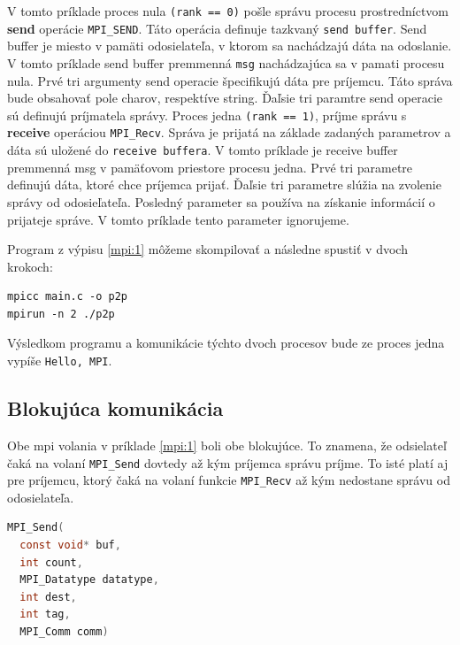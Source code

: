 V tomto príklade proces nula \texttt{(rank == 0)} pošle správu procesu prostredníctvom \textbf{send} operácie \texttt{MPI\_SEND}.
Táto operácia definuje tazkvaný \texttt{send buffer}. Send buffer je miesto v pamäti
odosielateľa, v ktorom sa nachádzajú dáta na odoslanie.
V tomto príklade send buffer premmenná \texttt{msg} nachádzajúca sa v pamati procesu nula.
Prvé tri argumenty send operacie špecifikujú dáta pre príjemcu. Táto správa bude obsahovať pole charov, respektíve string.
Ďaľsie tri paramtre send operacie sú definujú príjmatela správy.
Proces jedna \texttt{(rank == 1)}, príjme správu s \textbf{receive} operáciou \texttt{MPI\_Recv}.
Správa je prijatá na základe zadaných parametrov a dáta sú uložené do \texttt{receive buffera}.
V tomto príklade je receive buffer premmenná msg v pamäťovom priestore procesu jedna.
Prvé tri parametre definujú dáta, ktoré chce príjemca prijať. Ďaľsie tri parametre slúžia na zvolenie správy od odosieľateľa.
Posledný parameter sa používa na získanie informácií o prijateje správe. V tomto príklade tento parameter ignorujeme.

Program z výpisu \ref{mpi:1} môžeme skompilovať a následne spustiť v dvoch krokoch:
\begin{lstlisting}
mpicc main.c -o p2p
mpirun -n 2 ./p2p
\end{lstlisting}
Výsledkom programu a komunikácie týchto dvoch procesov bude ze proces jedna vypíše \texttt{Hello, MPI}.

\subsection{Blokujúca komunikácia}
Obe \acrshort{mpi} volania v príklade \ref{mpi:1} boli obe blokujúce.
To znamena, že odsielateľ čaká na volaní \texttt{MPI\_Send} dovtedy až kým príjemca správu príjme.
To isté platí aj pre príjemcu, ktorý čaká na volaní funkcie \texttt{MPI\_Recv}  až kým nedostane správu od odosielateľa.

\begin{lstlisting}[language=c, caption={MPI\_Send}, label={mpi:send}]
  MPI_Send(
  const void* buf,
  int count,
  MPI_Datatype datatype,
  int dest,
  int tag,
  MPI_Comm comm)
\end{lstlisting}

